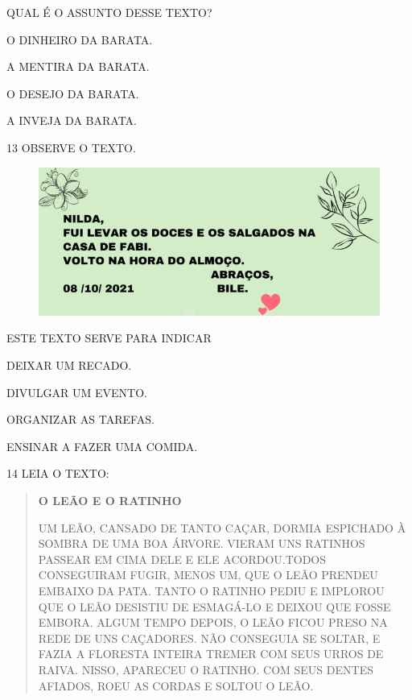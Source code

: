 QUAL É O ASSUNTO DESSE TEXTO?

\begin{escolha}
\item O DINHEIRO DA BARATA.

\item A MENTIRA DA BARATA.

\item O DESEJO DA BARATA.

\item A INVEJA DA BARATA.
\end{escolha}

\num{13} OBSERVE O TEXTO.

\begin{figure}[htpb]
\centering
\includegraphics[width=.8\textwidth]{media/image220.png}
\end{figure}

\pagebreak
ESTE TEXTO SERVE PARA INDICAR

\begin{escolha}
\item DEIXAR UM RECADO.

\item DIVULGAR UM EVENTO.

\item ORGANIZAR AS TAREFAS.

\item ENSINAR A FAZER UMA COMIDA.
\end{escolha}

\num{14} LEIA O TEXTO:

\begin{quote}
\textbf{O LEÃO E O RATINHO}

UM LEÃO, CANSADO DE TANTO CAÇAR, DORMIA ESPICHADO À SOMBRA
DE UMA BOA ÁRVORE. VIERAM UNS RATINHOS PASSEAR EM CIMA DELE
E ELE ACORDOU.TODOS CONSEGUIRAM FUGIR, MENOS UM, QUE O LEÃO
PRENDEU EMBAIXO DA PATA. TANTO O RATINHO PEDIU E IMPLOROU
QUE O LEÃO DESISTIU DE ESMAGÁ-LO E DEIXOU QUE FOSSE EMBORA.
ALGUM TEMPO DEPOIS, O LEÃO FICOU PRESO NA REDE DE
UNS CAÇADORES. NÃO CONSEGUIA SE SOLTAR, E FAZIA A FLORESTA
INTEIRA TREMER COM SEUS URROS DE RAIVA.
NISSO, APARECEU O RATINHO. COM SEUS DENTES AFIADOS,
ROEU AS CORDAS E SOLTOU O LEÃO.

\end{quote}

